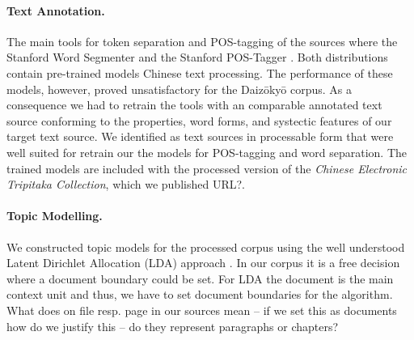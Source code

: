 \documentclass[a4paper,10pt]{article}
\newcommand{\TODO}[1]{\begingroup\color{red}#1\endgroup}
\begin{document}
\paragraph{Text Annotation.} 
The main tools for token separation and POS-tagging of the sources where
the Stanford Word Segmenter and the Stanford POS-Tagger
\cite{manning:2014}.  Both distributions contain pre-trained models Chinese
text processing. The performance of these models, however, proved
unsatisfactory for the Daiz{\=o}ky{\=o} corpus. As a consequence we had to
retrain the tools with an comparable annotated text source conforming to
the properties, word forms, and \TODO{systectic} features of our target
text source.  We identified  as text
sources in processable form that were well suited for retrain our the
models for POS-tagging and word separation. The trained models are included
with the processed version of the \textit{Chinese Electronic Tripitaka
  Collection}, which we published \TODO{URL?}.

\paragraph{Topic Modelling.}
  We constructed topic models for the processed corpus using the well
  understood Latent Dirichlet Allocation (LDA) approach 
  \cite{blei:2012,griffiths:2004}. In our corpus it is a free decision where 
  a document boundary could be set.  For LDA the document is the main context 
  unit and thus, we have to set document boundaries for the algorithm. 
  \TODO{What does on file resp. page in our sources mean -- if we set this as 
  documents how do we justify this -- do they represent paragraphs or chapters?}
\end{document}
